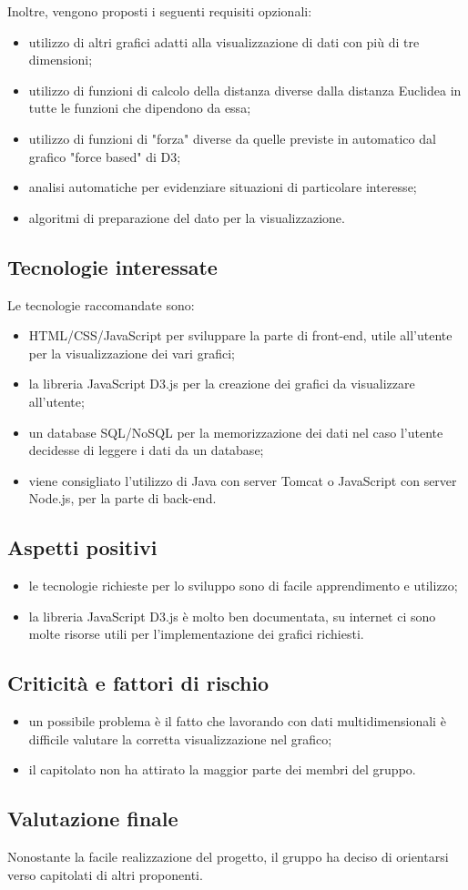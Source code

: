 Inoltre, vengono proposti i seguenti requisiti opzionali:
\begin{itemize}
\item utilizzo di altri grafici adatti alla visualizzazione di dati con più di tre dimensioni;
\item utilizzo di funzioni di calcolo della distanza diverse dalla distanza Euclidea in tutte le funzioni che dipendono da essa;
\item utilizzo di funzioni di "forza" diverse da quelle previste in automatico dal grafico "force based" di D3;
\item analisi automatiche per evidenziare situazioni di particolare interesse;
\item algoritmi di preparazione del dato per la visualizzazione.
\end{itemize}

\subsection{Tecnologie interessate}
Le tecnologie raccomandate sono:
\begin{itemize}
\item HTML/CSS/JavaScript per sviluppare la parte di front-end, utile all'utente per la visualizzazione dei vari grafici;
\item la libreria JavaScript D3.js per la creazione dei grafici da visualizzare all'utente;
\item un database SQL/NoSQL per la memorizzazione dei dati nel caso l'utente decidesse di leggere i dati da un database;
\item viene consigliato l’utilizzo di Java con server Tomcat o JavaScript con server Node.js, per la parte di back-end.
\end{itemize}

\subsection{Aspetti positivi}
\begin{itemize}
\item le tecnologie richieste per lo sviluppo sono di facile apprendimento e utilizzo;
\item la libreria JavaScript D3.js è molto ben documentata, su internet ci sono molte risorse utili per l'implementazione dei grafici richiesti.
\end{itemize}

\subsection{Criticità e fattori di rischio}
\begin{itemize}
\item un possibile problema è il fatto che lavorando con dati multidimensionali è difficile valutare la corretta visualizzazione nel grafico;
\item il capitolato non ha attirato la maggior parte dei membri del gruppo.
\end{itemize}

\subsection{Valutazione finale}
Nonostante la facile realizzazione del progetto, il gruppo ha deciso di orientarsi verso capitolati di altri proponenti.